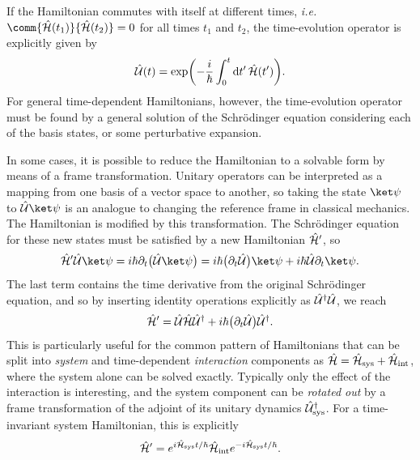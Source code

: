 If the Hamiltonian commutes with itself at different times, \textit{i.e.}\ $\comm{\H(t_1)}{\H(t_2)} = 0$ for all times $t_1$ and $t_2$, the time-evolution operator is explicitly given by
\begin{equation}
\hat{\mathcal U}(t) = \exp\biggl(-\frac i\hbar\int_0^t\mathrm dt'\,\hat{\mathcal H}(t')\biggr).
\end{equation}
For general time-dependent Hamiltonians, however, the time-evolution operator must be found by a general solution of the Schr\"odinger equation considering each of the basis states, or some perturbative expansion.

In some cases, it is possible to reduce the Hamiltonian to a solvable form by means of a frame transformation.
Unitary operators can be interpreted as a mapping from one basis of a vector space to another, so taking the state $\ket\psi$ to $\U\ket\psi$ is an analogue to changing the reference frame in classical mechanics.
The Hamiltonian is modified by this transformation.
The Schr\"odinger equation for these new states must be satisfied by a new Hamiltonian $\hat{\mathcal H}'$, so
\begin{equation}
\H'\U\ket\psi = i\hbar\partial_t \bigl(\U\ket\psi\bigr) = i\hbar\bigl(\partial_t\U\bigr)\ket\psi + i\hbar\U\partial_t\ket\psi.
\end{equation}
The last term contains the time derivative from the original Schr\"odinger equation, and so by inserting identity operations explicitly as $\hat{\mathcal U}^\dagger\hat{\mathcal U}$, we reach
\begin{equation}\label{eq:qi-frame-transformation}
\hat{\mathcal H}' = \hat{\mathcal U}\hat{\mathcal H}\hat{\mathcal U}^\dagger + i\hbar\bigl(\partial_t\hat{\mathcal U}\bigr)\hat{\mathcal U}^\dagger.
\end{equation}
This is particularly useful for the common pattern of Hamiltonians that can be split into \emph{system} and time-dependent \emph{interaction} components as $\hat{\mathcal H} = \hat{\mathcal H}_{\text{sys}} + \hat{\mathcal H}_{\text{int}}$, where the system alone can be solved exactly.
Typically only the effect of the interaction is interesting, and the system component can be \emph{rotated out} by a frame transformation of the adjoint of its unitary dynamics $\hat{\mathcal U}_{\text{sys}}^\dagger$.
For a time-invariant system Hamiltonian, this is explicitly
\begin{equation}
\hat{\mathcal H}' = e^{i\hat{\mathcal H}_{\text{sys}}t/\hbar} \hat{\mathcal H}_{\text{int}} e^{-i\hat{\mathcal H}_{\text{sys}}t/\hbar}.
\end{equation}

